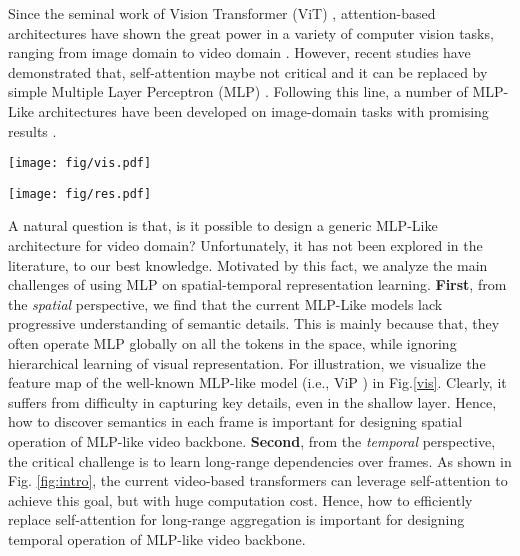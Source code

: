 \documentclass[runningheads]{llncs}
\begin{document}
Since the seminal work of Vision Transformer (ViT) \cite{vit}, 
attention-based architectures have shown the great power in a variety of computer vision tasks, ranging from image domain \cite{swin,cswin,pvt,t2t} to video domain \cite{timesformer,motionformer,video_swin,video_Transformer,vidtr}.
However,
recent studies have demonstrated that,
self-attention maybe not critical and it can be replaced by simple Multiple Layer Perceptron (MLP) \cite{mixer}.
Following this line,
a number of MLP-Like architectures have been developed on image-domain tasks with promising results \cite{vip,cyclemlp,gmlp,smlp,resmlp,mixer}.





\begin{figure*}[t]
    \centering
        \begin{minipage}[t]{0.38\linewidth}
        \centering
        \texttt{[image: fig/vis.pdf]}
 
        \caption{Visualization of spatial feature in 3rd layer.}
        \label{vis}
    \end{minipage}
    \hspace{2mm}
    \begin{minipage}[t]{0.58\linewidth}
        \centering
        \texttt{[image: fig/res.pdf]}
        \caption{Our MorphMLP vs. other SOTA Transformers and CNNs for video classification.
        Left: Kinetics400 \cite{k400}; Right: SthV2 \cite{sth}.}
        \label{fig:intro}
    \end{minipage}
  
\end{figure*}



A natural question is that,
is it possible to design a generic MLP-Like architecture for video domain?
Unfortunately,
it has not been explored in the literature,
to our best knowledge.
Motivated by this fact,
we analyze the main challenges of using MLP on spatial-temporal representation learning.
\textbf{First},
from the \textit{spatial} perspective,
we find that the current MLP-Like models lack progressive understanding of semantic details.
This is mainly because that,
they often operate MLP globally on all the tokens in the space,
while ignoring hierarchical learning of visual representation.
For illustration,
we visualize the feature map of the well-known MLP-like model (i.e., ViP \cite{vip}) in Fig.\ref{vis}.
Clearly,
it suffers from difficulty in capturing key details, 
even in the shallow layer.
Hence,
how to discover semantics in each frame is important for designing spatial operation of MLP-like video backbone.
\textbf{Second},
from the \textit{temporal} perspective,
the critical challenge is to learn long-range dependencies over frames.
As shown in Fig. \ref{fig:intro},
the current video-based transformers can leverage self-attention to achieve this goal,
but with huge computation cost.
Hence,
how to efficiently replace self-attention for long-range aggregation is important for designing temporal operation of MLP-like video backbone.
\end{document}
